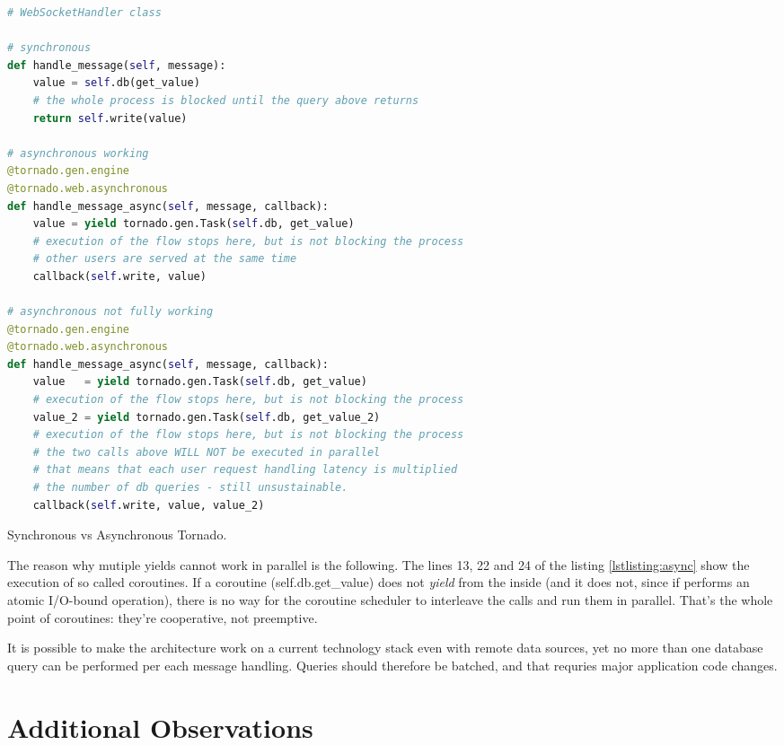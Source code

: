 \documentclass{uvamscse}
\begin{document}
\begin{sourcecode}[H]
\begin{lstlisting}[style=mono, language=Python]
# WebSocketHandler class

# synchronous
def handle_message(self, message):
    value = self.db(get_value)
    # the whole process is blocked until the query above returns
    return self.write(value)

# asynchronous working
@tornado.gen.engine
@tornado.web.asynchronous
def handle_message_async(self, message, callback):
    value = yield tornado.gen.Task(self.db, get_value)
    # execution of the flow stops here, but is not blocking the process
    # other users are served at the same time
    callback(self.write, value)

# asynchronous not fully working
@tornado.gen.engine
@tornado.web.asynchronous
def handle_message_async(self, message, callback):
    value   = yield tornado.gen.Task(self.db, get_value)
    # execution of the flow stops here, but is not blocking the process
    value_2 = yield tornado.gen.Task(self.db, get_value_2)
    # execution of the flow stops here, but is not blocking the process
    # the two calls above WILL NOT be executed in parallel
    # that means that each user request handling latency is multiplied
    # the number of db queries - still unsustainable.
    callback(self.write, value, value_2)
\end{lstlisting}
\caption{Synchronous vs Asynchronous Tornado.}
\label{lstlisting:async}
\end{sourcecode}

The reason why mutiple yields cannot work in parallel is the following. The lines 13, 22 and 24 of the listing \ref{lstlisting:async} show the execution of so called coroutines. If a coroutine (self.db.get\_value) does not \textit{yield} from the inside (and it does not, since if performs an atomic I/O-bound operation), there is no way for the coroutine scheduler to interleave the calls and run them in parallel. That's the whole point of coroutines: they're cooperative, not preemptive.

It is possible to make the architecture work on a current technology stack even with remote data sources, yet no more than one database query can be performed per each message handling. Queries should therefore be batched, and that requries major application code changes.

\section{Additional Observations}
\end{document}
